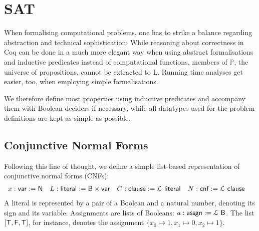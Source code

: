 \documentclass[a4paper,UKenglish,cleveref, autoref]{lipics-v2019}
\begin{document}
\section{SAT}
\newcommand{\var}{\textsf{var}}
\newcommand{\literal}{\textsf{literal}}
\newcommand{\clause}{\textsf{clause}}
\newcommand{\cnf}{\textsf{cnf}}
\newcommand{\assgn}{\textsf{assgn}}

\newcommand*{\eval}[2]{\mathcal{E}~#1~#2~}

When formalising computational problems, one has to strike a balance regarding abstraction and technical sophistication: While reasoning about correctness in Coq can be done in a much more elegant way when using abstract formalisations and inductive predicates instead of computational functions, members of $\mathbb{P}$, the universe of propositions, cannot be extracted to L. Running time analyses get easier, too, when employing simple formalisations. 

We therefore define most properties using inductive predicates and accompany them with Boolean deciders if necessary, while all datatypes used for the problem definitions are kept as simple as possible.

\subsection{Conjunctive Normal Forms}
Following this line of thought, we define a simple list-based representation of conjunctive normal forms (CNFs):
\begin{align*}
  x : \var := \nat &&
  L : \literal := \bool \times \var &&
  C : \clause := \listsof \literal &&
  N : \cnf := \listsof \clause && 
\end{align*}
A literal is represented by a pair of a Boolean and a natural number, denoting its sign and its variable. 
Assignments are lists of Booleans: $a : \assgn := \listsof \bool$. The list $[\mathsf{T}, \mathsf{F}, \mathsf{T}]$, for instance, denotes the assignment $\{x_0 \mapsto 1, x_1 \mapsto 0, x_2 \mapsto 1\}$. 
  
\end{document}
